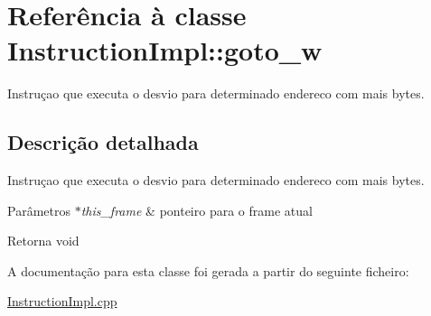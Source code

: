 \hypertarget{class_instruction_impl_1_1goto__w}{}\section{Referência à classe Instruction\+Impl\+:\+:goto\+\_\+w}
\label{class_instruction_impl_1_1goto__w}


Instruçao que executa o desvio para determinado endereco com mais bytes.  




\subsection{Descrição detalhada}
Instruçao que executa o desvio para determinado endereco com mais bytes. 


\begin{DoxyParams}{Parâmetros}
{\em $\ast$this\+\_\+frame} & ponteiro para o frame atual \\
\hline
\end{DoxyParams}
\begin{DoxyReturn}{Retorna}
void 
\end{DoxyReturn}


A documentação para esta classe foi gerada a partir do seguinte ficheiro\+:\begin{DoxyCompactItemize}
\item 
\hyperlink{_instruction_impl_8cpp}{Instruction\+Impl.\+cpp}\end{DoxyCompactItemize}
